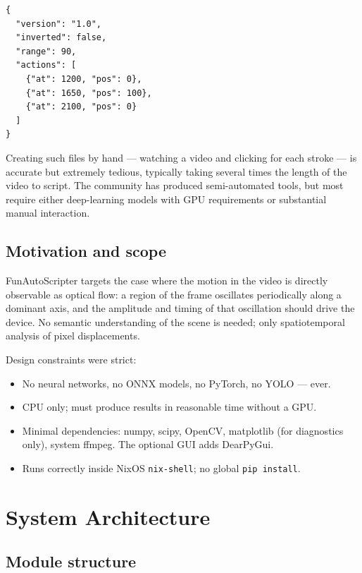 \documentclass[12pt,a4paper]{article}
\begin{document}
\begin{lstlisting}[style=jsonsnip]
{
  "version": "1.0",
  "inverted": false,
  "range": 90,
  "actions": [
    {"at": 1200, "pos": 0},
    {"at": 1650, "pos": 100},
    {"at": 2100, "pos": 0}
  ]
}
\end{lstlisting}

Creating such files by hand --- watching a video and clicking for each stroke
--- is accurate but extremely tedious, typically taking several times the
length of the video to script. The community has produced semi-automated tools,
but most require either deep-learning models with GPU requirements or
substantial manual interaction.

\subsection{Motivation and scope}

FunAutoScripter targets the case where the motion in the video is directly
observable as optical flow: a region of the frame oscillates periodically along
a dominant axis, and the amplitude and timing of that oscillation should drive
the device. No semantic understanding of the scene is needed; only spatiotemporal
analysis of pixel displacements.

Design constraints were strict:
\begin{itemize}[nosep]
  \item No neural networks, no ONNX models, no PyTorch, no YOLO --- ever.
  \item CPU only; must produce results in reasonable time without a GPU.
  \item Minimal dependencies: numpy, scipy, OpenCV, matplotlib (for
    diagnostics only), system ffmpeg. The optional GUI adds DearPyGui.
  \item Runs correctly inside NixOS \texttt{nix-shell}; no global
    \texttt{pip install}.
\end{itemize}

\section{System Architecture}
\label{sec:arch}

\subsection{Module structure}
\end{document}
